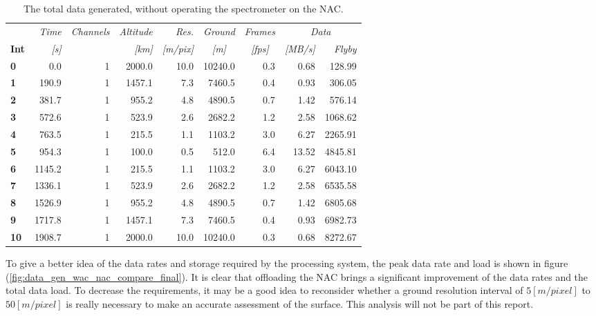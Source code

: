 \begin{table}[h!]
  \centering
    \begin{tabular}{l|r|r|r|r|r|r|r|r}
      & \textit{Time} & \textit{Channels} & \textit{Altitude} & \textit{Res.} & \textit{Ground} & \textit{Frames } & \multicolumn{2}{c}{\textit{Data}} \\
\textbf{Int} & \textit{[s]} & \textit{} & \textit{[km]} & \textit{[m/pix]} & \multicolumn{1}{c|}{\textit{[m]}} & \multicolumn{1}{c|}{\textit{[fps]}} & \textit{[MB/s]} & \textit{Flyby} \bigstrut[b]\\
\hline
\textbf{0} & 0.0   & 1     & 2000.0 & 10.0  & 10240.0 & 0.3   & 0.68  & 128.99 \bigstrut[t]\\
\textbf{1} & 190.9 & 1     & 1457.1 & 7.3   & 7460.5 & 0.4   & 0.93  & 306.05 \\
\textbf{2} & 381.7 & 1     & 955.2 & 4.8   & 4890.5 & 0.7   & 1.42  & 576.14 \\
\textbf{3} & 572.6 & 1     & 523.9 & 2.6   & 2682.2 & 1.2   & 2.58  & 1068.62 \\
\textbf{4} & 763.5 & 1     & 215.5 & 1.1   & 1103.2 & 3.0   & 6.27  & 2265.91 \\
\textbf{5} & 954.3 & 1     & 100.0 & 0.5   & 512.0 & 6.4   & 13.52 & 4845.81 \\
\textbf{6} & 1145.2 & 1     & 215.5 & 1.1   & 1103.2 & 3.0   & 6.27  & 6043.10 \\
\textbf{7} & 1336.1 & 1     & 523.9 & 2.6   & 2682.2 & 1.2   & 2.58  & 6535.58 \\
\textbf{8} & 1526.9 & 1     & 955.2 & 4.8   & 4890.5 & 0.7   & 1.42  & 6805.68 \\
\textbf{9} & 1717.8 & 1     & 1457.1 & 7.3   & 7460.5 & 0.4   & 0.93  & 6982.73 \\
\textbf{10} & 1908.7 & 1     & 2000.0 & 10.0  & 10240.0 & 0.3   & 0.68  & 8272.67 \\
\end{tabular}%
    \caption{The total data generated, without operating the spectrometer on the NAC.}
  \label{tab:nac_flyby_data_spectrometer_final}%
\end{table}%
To give a better idea of the data rates and storage required by the processing system, the peak data rate and load is shown in figure (\ref{fig:data_gen_wac_nac_compare_final}). It is clear that offloading the NAC brings a significant improvement of the data rates and the total data load. To decrease the requirements, it may be a good idea to reconsider whether a ground resolution interval of $5[m/pixel]$ to $50[m/pixel]$ is really necessary to make an accurate assessment of the surface. This analysis will not be part of this report.
